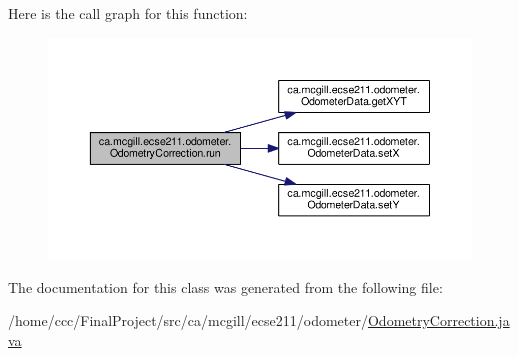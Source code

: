Here is the call graph for this function\+:\nopagebreak
\begin{figure}[H]
\begin{center}
\leavevmode
\includegraphics[width=350pt]{classca_1_1mcgill_1_1ecse211_1_1odometer_1_1_odometry_correction_aad66a7030ac00f3a9cbe7bc33c25acbf_cgraph}
\end{center}
\end{figure}


The documentation for this class was generated from the following file\+:\begin{DoxyCompactItemize}
\item 
/home/ccc/\+Final\+Project/src/ca/mcgill/ecse211/odometer/\hyperlink{_odometry_correction_8java}{Odometry\+Correction.\+java}\end{DoxyCompactItemize}
